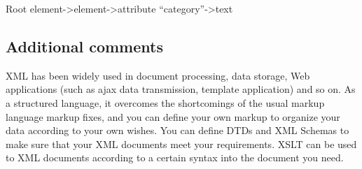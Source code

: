Root element->element->attribute “category”->text

\subsection{Additional comments}
%
%

XML has been widely used in document processing, data storage, Web applications (such as ajax data transmission, template application) and so on.
As a structured language, it overcomes the shortcomings of the usual markup language markup fixes, and you can define your own markup to organize your data according to your own wishes.
You can define DTDs and XML Schemas to make sure that your XML documents meet your requirements.
XSLT can be used to XML documents according to a certain syntax into the document you need.

